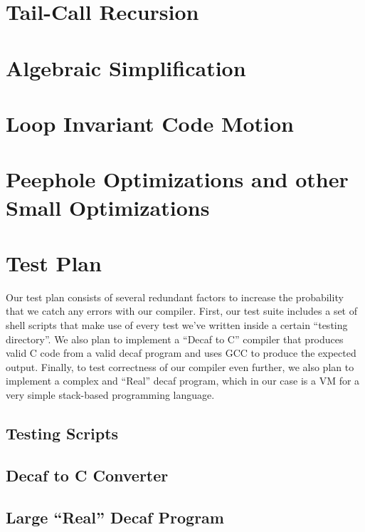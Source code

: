 \documentclass[11pt]{article}
\begin{document}
\section {Tail-Call Recursion}
\label{sec:tailcall}

\section {Algebraic Simplification}
\label{sec:algebra}

\section {Loop Invariant Code Motion}
\label{sec:codehoist}

\section {Peephole Optimizations and other Small Optimizations}
\label{sec:peephole}

\section {Test Plan}
\label{sec:test}

Our test plan consists of several redundant factors to increase the
probability that we catch any errors with our compiler. First, our
test suite includes a set of shell scripts that make use of every test
we've written inside a certain ``testing directory''. We also plan to
implement a ``Decaf to C'' compiler that produces valid C code from a
valid decaf program and uses GCC to produce the expected
output. Finally, to test correctness of our compiler even further, we
also plan to implement a complex and ``Real'' decaf program, which in
our case is a VM for a very simple stack-based programming language. 

\subsection {Testing Scripts}

\subsection {Decaf to C Converter} 

\subsection {Large ``Real'' Decaf Program}
\end{document}
